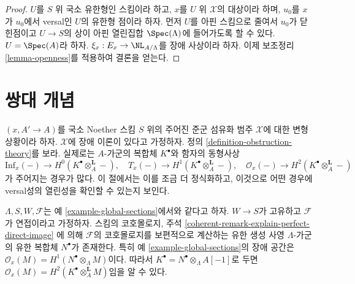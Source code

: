 \begin{proof}
$U$를 $S$ 위 국소 유한형인 스킴이라 하고,
$x$를 $U$ 위 $\mathcal{X}$의 대상이라 하며, $u_0$를 $x$가 $u_0$에서
versal인 $U$의 유한형 점이라 하자. 먼저 $U$를 아핀 스킴으로 줄여서
$u_0$가 닫힌점이고 $U \to S$의 상이 아핀 열린집합
$\Spec(\Lambda)$에 들어가도록 할 수 있다. $U = \Spec(A)$라 하자.
$\xi_x : E_x \to \NL_{A/\Lambda}$를 장애 사상이라 하자.
이제 보조정리 \ref{lemma-openness}를 적용하여 결론을 얻는다.
\end{proof}









\section{쌍대 개념}
\label{section-dual}

\noindent
$(x, A' \to A)$를 국소 Noether 스킴 $S$ 위의 주어진 준군 섬유화 범주
$\mathcal{X}$에 대한 변형 상황이라 하자.
$\mathcal{X}$에 장애 이론이 있다고 가정하자.
정의 \ref{definition-obstruction-theory}를 보라. 실제로는
$A$-가군의 복합체 $K^\bullet$와 함자의 동형사상
$$
\text{Inf}_x(-) \to H^0(K^\bullet \otimes_A^\mathbf{L} -),\quad
T_x(-) \to H^1(K^\bullet \otimes_A^\mathbf{L} -),\quad
\mathcal{O}_x(-) \to H^2(K^\bullet \otimes_A^\mathbf{L} -)
$$
가 주어지는 경우가 많다. 이 절에서는 이를 조금 더 정식화하고, 이것으로
어떤 경우에 versal성의 열린성을 확인할 수 있는지 보인다.

\begin{example}
\label{example-global-sections-dual}
$\Lambda, S, W, \mathcal{F}$는 예 \ref{example-global-sections}에서와 같다고 하자.
$W \to S$가 고유하고 $\mathcal{F}$가 연접이라고 가정하자.
스킴의 코호몰로지, 주석
\ref{coherent-remark-explain-perfect-direct-image}
에 의해 $\mathcal{F}$의 코호몰로지를 보편적으로 계산하는 유한 생성 사영
$\Lambda$-가군의 유한 복합체 $N^\bullet$가 존재한다.
특히 예 \ref{example-global-sections}의 장애 공간은
$\mathcal{O}_x(M) = H^1(N^\bullet \otimes_\Lambda M)$이다.
따라서 $K^\bullet = N^\bullet \otimes_\Lambda A[-1]$로 두면
$\mathcal{O}_x(M) = H^2(K^\bullet \otimes_A^\mathbf{L} M)$임을 알 수 있다.
\end{example}

